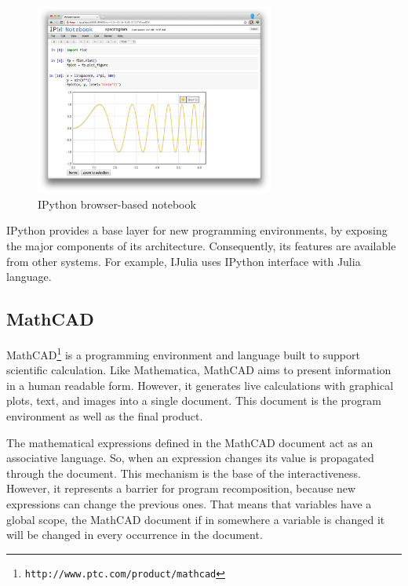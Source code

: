 \begin{figure}[!htbp]
  \centering
    \includegraphics[width=0.7\textwidth]{images/ipython}
 \caption{IPython browser-based notebook}
    \label{fig:ipython}
\end{figure}

IPython provides a base layer for new programming environments, by exposing the major components of its architecture. Consequently, its features are available from other systems. For example, IJulia uses IPython interface with Julia language. 
\subsection{MathCAD}
\label{subsec:mathcad}
MathCAD\footnote{\texttt{http://www.ptc.com/product/mathcad}} is a programming environment and language built to support scientific calculation. Like Mathematica, MathCAD aims to present information in a human readable form. However, it generates live calculations with graphical plots, text, and images into a single document. This document is the program environment as well as the final product.

The mathematical expressions defined in the MathCAD document act as an associative language. So, when an expression changes its value is propagated through the document. This mechanism is the base of the interactiveness. However, it represents a barrier for program recomposition, because new expressions can change the previous ones. That means that variables have a global scope, the MathCAD document if in somewhere a variable is changed it will be changed in every occurrence in the document.   
